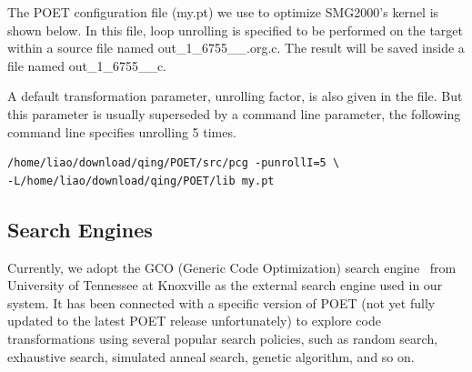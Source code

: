  

The POET configuration file (my.pt) we use to optimize SMG2000's kernel is shown
below. In this file, loop unrolling is specified to be performed on the target
within a source file named out\_1\_6755\_\_.org.c. 
The result will be saved inside a file named out\_1\_6755\_\_c.
\lstset{basicstyle=\scriptsize}


A default transformation parameter, unrolling factor, is also given in the
file. But this parameter is usually superseded by a command line
parameter, the following command line specifies unrolling 5 times.
{\mySmallFontSize
\begin{verbatim}
/home/liao/download/qing/POET/src/pcg -punrollI=5 \
-L/home/liao/download/qing/POET/lib my.pt 
\end{verbatim}
}


\subsection{Search Engines}
Currently, we adopt the GCO (Generic Code Optimization) search engine~\cite{Youeffective2005} from University of Tennessee
at Knoxville as the external search engine used in our system.  
It has been connected with
a specific version of POET (not yet fully updated to the latest POET release
unfortunately) to explore code transformations using several popular search policies,
such as random search, exhaustive search, simulated anneal search, genetic algorithm,
and so on.


